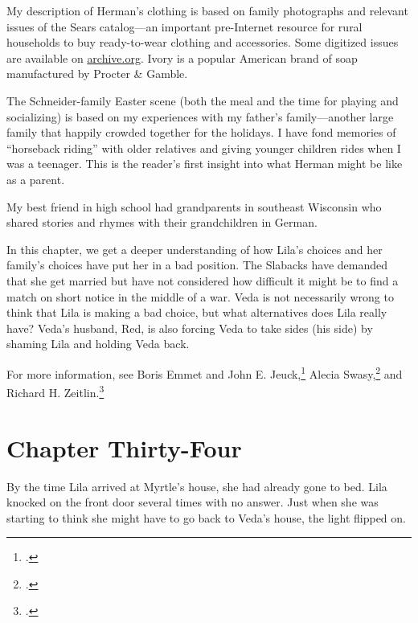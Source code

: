 \documentclass[
  american,
  letterpaper,
]{book}
\begin{document}
My description of Herman's clothing is based on family photographs and
relevant issues of the Sears catalog---an important pre-Internet
resource for rural households to buy ready-to-wear clothing and
accessories. Some digitized issues are available on
\href{http://archive.org/}{archive.org}. Ivory is a popular American
brand of soap manufactured by Procter \& Gamble.

The Schneider-family Easter scene (both the meal and the time for
playing and socializing) is based on my experiences with my father's
family---another large family that happily crowded together for the
holidays. I have fond memories of ``horseback riding'' with older
relatives and giving younger children rides when I was a teenager. This
is the reader's first insight into what Herman might be like as a
parent.

My best friend in high school had grandparents in southeast Wisconsin
who shared stories and rhymes with their grandchildren in German.

In this chapter, we get a deeper understanding of how Lila's choices and
her family's choices have put her in a bad position. The Slabacks have
demanded that she get married but have not considered how difficult it
might be to find a match on short notice in the middle of a war. Veda is
not necessarily wrong to think that Lila is making a bad choice, but
what alternatives does Lila really have? Veda's husband, Red, is also
forcing Veda to take sides (his side) by shaming Lila and holding Veda
back.

For more information, see Boris Emmet and John E. Jeuck,\footnote{.} Alecia Swasy,\footnote{.} and Richard H. Zeitlin.\footnote{.}


\chapter{Chapter Thirty-Four}\label{chapter-thirty-four}

By the time Lila arrived at Myrtle's house, she had already gone to bed.
Lila knocked on the front door several times with no answer. Just when
she was starting to think she might have to go back to Veda's house, the
light flipped on.
\end{document}
